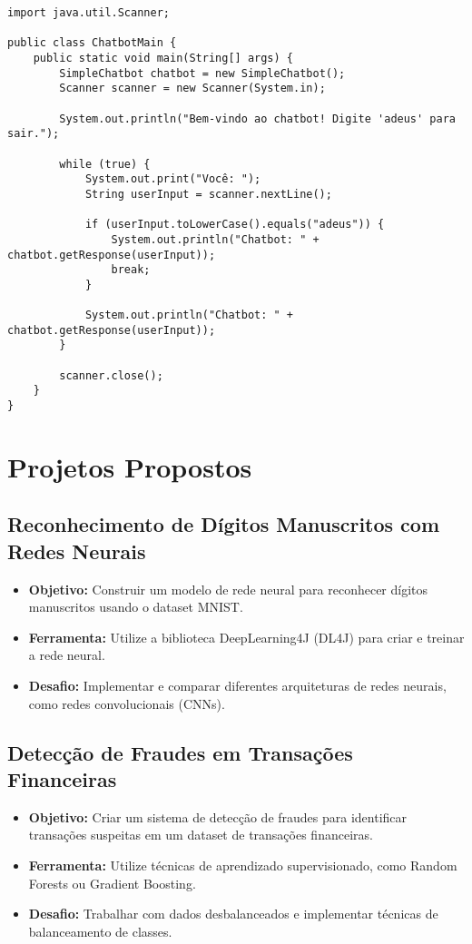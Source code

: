 \documentclass[a4paper,12pt]{book}
\begin{document}
\begin{lstlisting}
import java.util.Scanner;

public class ChatbotMain {
    public static void main(String[] args) {
        SimpleChatbot chatbot = new SimpleChatbot();
        Scanner scanner = new Scanner(System.in);

        System.out.println("Bem-vindo ao chatbot! Digite 'adeus' para sair.");

        while (true) {
            System.out.print("Você: ");
            String userInput = scanner.nextLine();

            if (userInput.toLowerCase().equals("adeus")) {
                System.out.println("Chatbot: " + chatbot.getResponse(userInput));
                break;
            }

            System.out.println("Chatbot: " + chatbot.getResponse(userInput));
        }

        scanner.close();
    }
}
\end{lstlisting}

\section{Projetos Propostos}

\subsection{Reconhecimento de Dígitos Manuscritos com Redes Neurais}
\begin{itemize}
    \item \textbf{Objetivo:} Construir um modelo de rede neural para reconhecer dígitos manuscritos usando o dataset MNIST.
    \item \textbf{Ferramenta:} Utilize a biblioteca DeepLearning4J (DL4J) para criar e treinar a rede neural.
    \item \textbf{Desafio:} Implementar e comparar diferentes arquiteturas de redes neurais, como redes convolucionais (CNNs).
\end{itemize}

\subsection{Detecção de Fraudes em Transações Financeiras}
\begin{itemize}
    \item \textbf{Objetivo:} Criar um sistema de detecção de fraudes para identificar transações suspeitas em um dataset de transações financeiras.
    \item \textbf{Ferramenta:} Utilize técnicas de aprendizado supervisionado, como Random Forests ou Gradient Boosting.
    \item \textbf{Desafio:} Trabalhar com dados desbalanceados e implementar técnicas de balanceamento de classes.
\end{itemize}
\end{document}
